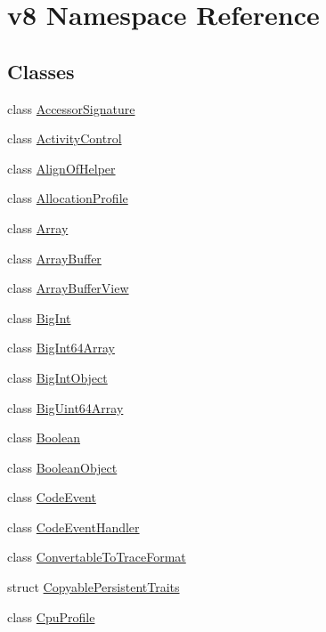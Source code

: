 \hypertarget{namespacev8}{}\section{v8 Namespace Reference}
\label{namespacev8}
\subsection*{Classes}
\begin{DoxyCompactItemize}
\item 
class \mbox{\hyperlink{classv8_1_1AccessorSignature}{Accessor\+Signature}}
\item 
class \mbox{\hyperlink{classv8_1_1ActivityControl}{Activity\+Control}}
\item 
class \mbox{\hyperlink{classv8_1_1AlignOfHelper}{Align\+Of\+Helper}}
\item 
class \mbox{\hyperlink{classv8_1_1AllocationProfile}{Allocation\+Profile}}
\item 
class \mbox{\hyperlink{classv8_1_1Array}{Array}}
\item 
class \mbox{\hyperlink{classv8_1_1ArrayBuffer}{Array\+Buffer}}
\item 
class \mbox{\hyperlink{classv8_1_1ArrayBufferView}{Array\+Buffer\+View}}
\item 
class \mbox{\hyperlink{classv8_1_1BigInt}{Big\+Int}}
\item 
class \mbox{\hyperlink{classv8_1_1BigInt64Array}{Big\+Int64\+Array}}
\item 
class \mbox{\hyperlink{classv8_1_1BigIntObject}{Big\+Int\+Object}}
\item 
class \mbox{\hyperlink{classv8_1_1BigUint64Array}{Big\+Uint64\+Array}}
\item 
class \mbox{\hyperlink{classv8_1_1Boolean}{Boolean}}
\item 
class \mbox{\hyperlink{classv8_1_1BooleanObject}{Boolean\+Object}}
\item 
class \mbox{\hyperlink{classv8_1_1CodeEvent}{Code\+Event}}
\item 
class \mbox{\hyperlink{classv8_1_1CodeEventHandler}{Code\+Event\+Handler}}
\item 
class \mbox{\hyperlink{classv8_1_1ConvertableToTraceFormat}{Convertable\+To\+Trace\+Format}}
\item 
struct \mbox{\hyperlink{structv8_1_1CopyablePersistentTraits}{Copyable\+Persistent\+Traits}}
\item 
class \mbox{\hyperlink{classv8_1_1CpuProfile}{Cpu\+Profile}}
\item 

\end{DoxyCompactItemize}
